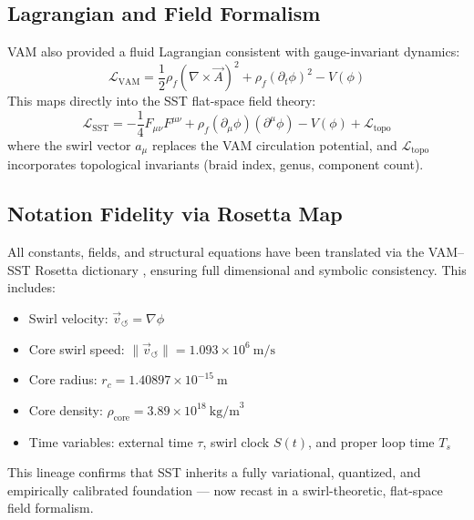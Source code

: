 \documentclass[reprint,aps,onecolumn,nofootinbib]{revtex4-2}
\begin{document}
    \subsection{Lagrangian and Field Formalism}

        VAM also provided a fluid Lagrangian consistent with gauge-invariant dynamics:
        \begin{equation}
        \mathcal{L}_\text{VAM} = \frac{1}{2} \rho_f (\nabla \times \vec{A})^2 + \rho_f (\partial_t \phi)^2 - V(\phi)
        \end{equation}
        This maps directly into the SST flat-space field theory:
        \begin{equation}
        \mathcal{L}_\text{SST} = -\frac{1}{4} F_{\mu\nu} F^{\mu\nu} + \rho_f (\partial_\mu \phi)(\partial^\mu \phi) - V(\phi) + \mathcal{L}_{\text{topo}}
        \end{equation}
        where the swirl vector \( a_\mu \) replaces the VAM circulation potential, and \( \mathcal{L}_{\text{topo}} \) incorporates topological invariants (braid index, genus, component count).

    \subsection{Notation Fidelity via Rosetta Map}

        All constants, fields, and structural equations have been translated via the VAM–SST Rosetta dictionary \cite{vamrosetta2025}, ensuring full dimensional and symbolic consistency. This includes:
        \begin{itemize}
        \item Swirl velocity: \( \vec{v}_{\circlearrowleft} = \nabla \phi \)
        \item Core swirl speed: \( \|\vec{v}_{\circlearrowleft}\| = 1.093 \times 10^6\ \text{m/s} \)
        \item Core radius: \( r_c = 1.40897 \times 10^{-15}\ \text{m} \)
        \item Core density: \( \rho_{\text{core}} = 3.89 \times 10^{18}\ \text{kg/m}^3 \)
        \item Time variables: external time \( \tau \), swirl clock \( S(t) \), and proper loop time \( T_s \)
        \end{itemize}

        This lineage confirms that SST inherits a fully variational, quantized, and empirically calibrated foundation — now recast in a swirl-theoretic, flat-space field formalism.
\end{document}
